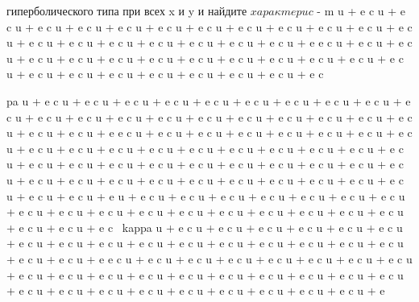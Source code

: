 \documentclass[
  ukrainian,
]{article}
\begin{document}
гиперболического типа при всех x и y и найдите
\(x a p a \kappa m e p u c\) - m u + e c \kappa u + e c \kappa u + e c
\kappa u + e c \kappa u + e c \kappa u + e c \kappa u + e c \kappa u + e
c \kappa u + e c \kappa u + e c \kappa u + e c \kappa u + e c \kappa u +
e c \kappa u + e c \kappa u + e c \kappa u + e c \kappa u + e c \kappa u
+ e c \kappa u + e c \kappa u + e e c \kappa u + e c \kappa u + e c
\kappa u + e c \kappa u + e c \kappa u + e c \kappa u + e c \kappa u + e
c \kappa u + e c \kappa u + e c \kappa u + e c \kappa u + e c \kappa u +
e c \kappa u + e c \kappa u + e c \kappa u + e c \kappa u + e c \kappa u
+ e c \kappa u + e c \kappa u + e c \kap u + e c \kap

pa u + e c \kappa u + e c \kappa u + e c \kappa u + e c \kappa u + e c
\kappa u + e c \kappa u + e c \kappa u + e c \kappa u + e c \kappa u + e
c \kappa u + e c \kappa u + e c \kappa u + e c \kappa u + e c \kappa u +
e c \kappa u + e c \kappa u + e c \kappa u + e c \kappa u + e c \kappa u
+ e c \kappa u + e c \kappa u + e c \kappa u + e e c \kappa u + e c
\kappa u + e c \kappa u + e c \kappa u + e c \kappa u + e c \kappa u + e
c \kappa u + e c \kappa u + e c \kappa u + e c \kappa u + e c \kappa u +
e c \kappa u + e c \kappa u + e c \kappa u + e c \kappa u + e c \kappa u
+ e c \kappa u + e c \kappa u + e c \kappa u + e c \kappa u + e c
\kappa u + e c \kappa u + e c \kappa u + e c \kappa u + e c \kappa u + e
c \kappa u + e c \kappa u + e c \kappa u + e c \kappa u + e c \kappa u +
e c \kappa u + e c \kappa u + e c \kappa u + e c \kappa u + e c \kappa u
+ e c \kappa u + e c \kappa u + e c \kappa u + e c \kappa u + e c
\kappa u + e u + e c \kappa u + e c \kappa u + e c \kappa u + e c
\kappa u + e c \kappa u + e c \kappa u + e c \kappa u + e c \kappa u + e
c \kappa u + e c \kappa u + e c \kappa u + e c \kappa u + e c \kappa u +
e c \kappa u + e c \kappa u + e c \kappa u + e c \kappa u + e c \kappa u
+ e c \kappa u + e c ~kappa u + e c \kappa u + e c \kappa u + e c
\kappa u + e c \kappa u + e c \kappa u + e c \kappa u + e c \kappa u + e
c \kappa u + e c \kappa u + e c \kappa u + e c \kappa u + e c \kappa u +
e c \kappa u + e c \kappa u + e c \kappa u + e c \kappa u + e c \kappa u
+ e c \kappa u + e e c \kappa u + e c \kappa u + e c \kappa u + e c
\kappa u + e c \kappa u + e c \kappa u + e c \kappa u + e c \kappa u + e
c \kappa u + e c \kappa u + e c \kappa u + e c \kappa u + e c \kappa u +
e c \kappa u + e c \kappa u + e c \kappa u + e c \kappa u + e c \kappa u
+ e c \kappa u + e c \kappa u + e c \kappa u + e c \kappa u + e c
\kappa u + e c \kappa u + e c \kappa u + e c \kappa u + e c \kappa u + e
\end{document}
